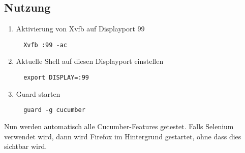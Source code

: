 \subsection*{Nutzung}

\begin{enumerate}
 \item Aktivierung von Xvfb auf Displayport 99
 \begin{verbatim}
  Xvfb :99 -ac
 \end{verbatim}

 \item Aktuelle Shell auf diesen Displayport einstellen
 \begin{verbatim}
  export DISPLAY=:99
 \end{verbatim}

 \item Guard starten
 \begin{verbatim}
  guard -g cucumber
 \end{verbatim}
\end{enumerate}

Nun werden automatisch alle Cucumber-Features getestet. Falls Selenium verwendet wird, dann wird Firefox im Hintergrund gestartet, ohne dass dies sichtbar wird.





